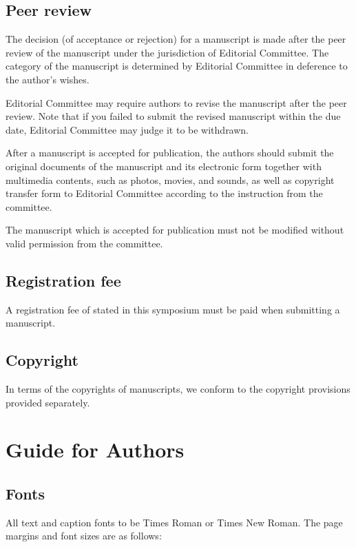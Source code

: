 \documentclass[a4paper,10pt,conference,compsoc]{ISASE}
\begin{document}
\subsection{Peer review}

The decision (of acceptance or rejection) for a manuscript is made after the
peer review of the manuscript under the jurisdiction of Editorial Committee.
The category of the manuscript is determined by Editorial Committee in
deference to the author's wishes.

Editorial Committee may require authors to revise the manuscript after the peer
review. Note that if you failed to submit the revised manuscript within the due
date, Editorial Committee may judge it to be withdrawn.

After a manuscript is accepted for publication, the authors should submit the
original documents of the manuscript and its electronic form together with
multimedia contents, such as photos, movies, and sounds, as well as copyright
transfer form to Editorial Committee according to the instruction from the
committee.

The manuscript which is accepted for publication must not be modified without
valid permission from the committee.

\subsection{Registration fee}

A registration fee of stated in this symposium must be paid when submitting a
manuscript.

\subsection{Copyright}

In terms of the copyrights of manuscripts, we conform to the copyright
provisions provided separately.

\section{Guide for Authors}

\subsection{Fonts}

All text and caption fonts to be Times Roman or Times New Roman. The page
margins and font sizes are as follows:
\end{document}
